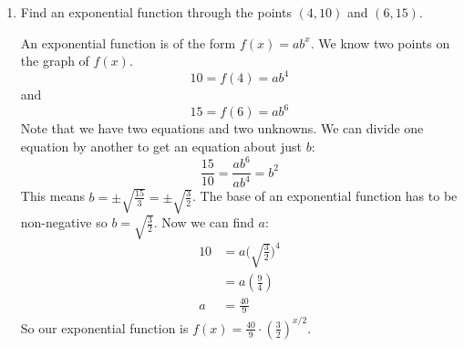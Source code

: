 \documentclass{article}
\begin{document}
\begin{enumerate}
  \begin{enumerate}[resume]
  \item

    \begin{problem}[\vfill]
      \textbf{Approach 2.} Since the population is growing exponentially, we can write $R(t) = C \cdot b^t$; we need to find $C$ and $b$.

      What are $R(0)$ and $R(14)$? How can you use these two facts to find $C$ and $b$? 
    \end{problem}

    \begin{solution}
      We know that $R(0)=900$. Since $R(t) = C \cdot b^t$, 
      we have the equation
      \begin{align*}
       C \cdot b^0 &= 900 \\
       C &= 900
      \end{align*}
      We also know that $R(14)=1200$, so
      \begin{align*}
        900 \cdot b^{14} &= 1200 \\
        b^{14} &= \tfrac{4}{3} \\
        b &= \left(\tfrac{4}{3}\right)^{1/14}
      \end{align*}
      Therefore $R(t) = 900 \left(\frac{4}{3}\right)^{t/14}$.
    \end{solution}

  \item

    \begin{problem}[\stretch{0.25}]
      Which approach do you prefer?
    \end{problem}

  \end{enumerate}

\item  \label{fit-exp-to-data-points-1}

  \begin{problem}[\stretch{1.5}]
    Find an exponential function through the points $(4, 10)$ and $(6, 15)$.
  \end{problem}

  \begin{solution}
    An exponential function is of the form $f(x) = ab^x$. We know two points on the graph of $f(x)$. $$10=f(4) =ab^4$$ and $$15=f(6)=ab^6$$ Note that we have two equations and two unknowns. We can divide one equation by another to get an equation about just $b$:
    $$ \frac{15}{10} = \frac{ab^6}{ab^4}=b^2$$
    This means $b =\pm \sqrt{\frac{15}{3}}=\pm \sqrt{\frac{3}{2}}$. 
    The base of an exponential function has to be non-negative so $b= \sqrt{\frac{3}{2}}$. Now we can find $a$:
    \begin{align*} 
    10&=a\bigg(\sqrt{\frac{3}{2}}\bigg)^4 \\
    &= a \left(\frac{9}{4}\right) \\
    a &= \frac{40}{9}
    \end{align*}
    So our exponential function is $f(x) = \frac{40}{9}\cdot
    \left(\frac{3}{2}\right)^{x/2}$.
  \end{solution}


\end{enumerate}
\end{document}
